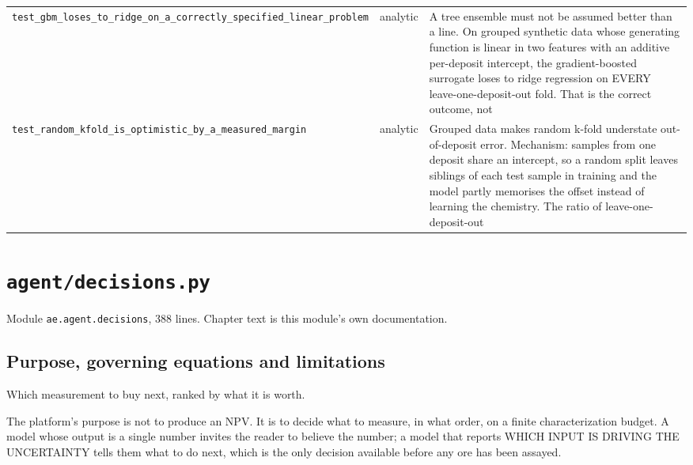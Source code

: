 \documentclass[10pt,a4paper,twoside]{report}
\begin{document}
\begin{longtable}{@{}p{}p{}p{}@{}}
{\scriptsize\texttt{test\_\discretionary{}{}{}gbm\_\discretionary{}{}{}loses\_\discretionary{}{}{}to\_\discretionary{}{}{}ridge\_\discretionary{}{}{}on\_\discretionary{}{}{}a\_\discretionary{}{}{}correctly\_\discretionary{}{}{}specified\_\discretionary{}{}{}linear\_\discretionary{}{}{}problem}} & analytic & A tree ensemble must not be assumed better than a line. On grouped synthetic data whose generating function is linear in two features with an additive per-deposit intercept, the gradient-boosted surrogate loses to ridge regression on EVERY leave-one-deposit-out fold. That is the correct outcome, not \\

{\scriptsize\texttt{test\_\discretionary{}{}{}random\_\discretionary{}{}{}kfold\_\discretionary{}{}{}is\_\discretionary{}{}{}optimistic\_\discretionary{}{}{}by\_\discretionary{}{}{}a\_\discretionary{}{}{}measured\_\discretionary{}{}{}margin}} & analytic & Grouped data makes random k-fold understate out-of-deposit error. Mechanism: samples from one deposit share an intercept, so a random split leaves siblings of each test sample in training and the model partly memorises the offset instead of learning the chemistry. The ratio of leave-one-deposit-out  \\

\bottomrule \end{longtable}

\normalsize

\clearpage

\chapter{\texttt{agent/decisions.py}}\label{ch:decisions}


{\footnotesize\color{slate}Module \texttt{ae.agent.decisions}, 388 lines. Chapter text is this module's own documentation.\par}

\section{Purpose, governing equations and limitations}

Which measurement to buy next, ranked by what it is worth.

The platform's purpose is not to produce an NPV. It is to decide what to measure, in what order, on a finite characterization budget. A model whose output is a single number invites the reader to believe the number; a model that reports WHICH INPUT IS DRIVING THE UNCERTAINTY tells them what to do next, which is the only decision available before any ore has been assayed.
\end{document}
